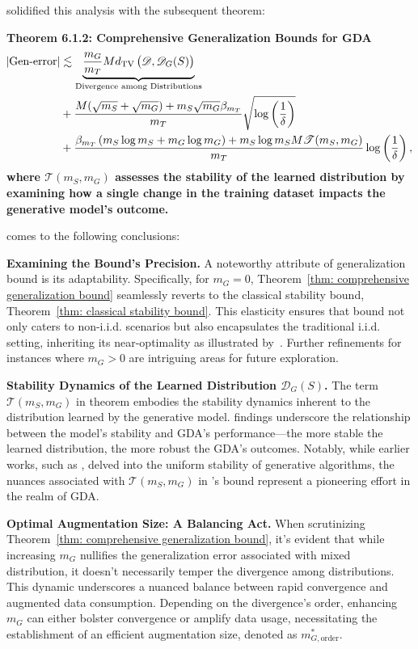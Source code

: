 \documentclass[preprint,12pt,authoryear]{elsarticle}
\newcommand{\sD}{{\mathscr D}}
\newcommand{\sT}{{\mathscr T}}
\newcommand{\DG}{\sD_G(S)}
\begin{document}
\cite{171_theory} solidified this analysis with the subsequent theorem:

\textbf{Theorem 6.1.2: Comprehensive Generalization Bounds for GDA}
\label{thm: comprehensive generalization bound}
\begin{align*}
\abs{\text{Gen-error}} 
&\lesssim \underbrace{\frac{m_G}{m_T}M d_{\mathrm{TV}} \left(\sD , \DG \right)}_{\text{Divergence among Distributions}} \\
&+ \frac{M(\sqrt{m_S} + \sqrt{m_G}) + m_S\sqrt{m_G}\beta_{m_T} }{m_T} \sqrt{\log \left(\frac{1}{\delta}\right)}\\
&+\frac{\beta_{m_T} \left(m_S \log m_S + m_G \log m_G\right) + m_S \log m_S M \sT(m_S, m_G) }{m_T} \log \left(\frac{1}{\delta}\right),
\end{align*}
\textbf{where $\sT(m_S, m_G)$ assesses the stability of the learned distribution by examining how a single change in the training dataset impacts the generative model's outcome.}

\cite{171_theory} comes to the following conclusions:

\textbf{Examining the Bound's Precision.} A noteworthy attribute of \cite{171_theory} generalization bound is its adaptability. Specifically, for $m_G = 0$, Theorem~\ref{thm: comprehensive generalization bound} seamlessly reverts to the classical stability bound, Theorem~\ref{thm: classical stability bound}. This elasticity ensures that \cite{171_theory} bound not only caters to non-i.i.d. scenarios but also encapsulates the traditional i.i.d. setting, inheriting its near-optimality as illustrated by~\cite{166_theory}. Further refinements for instances where $m_G > 0$ are intriguing areas for future exploration.

\textbf{Stability Dynamics of the Learned Distribution $\DG$.} The term $\sT(m_S, m_G)$ in \cite{171_theory} theorem embodies the stability dynamics inherent to the distribution learned by the generative model. \cite{171_theory} findings underscore the relationship between the model's stability and GDA's performance—the more stable the learned distribution, the more robust the GDA's outcomes. Notably, while earlier works, such as \cite{170_theory}, delved into the uniform stability of generative algorithms, the nuances associated with $\sT(m_S, m_G)$ in \cite{171_theory}'s bound represent a pioneering effort in the realm of GDA.

\textbf{Optimal Augmentation Size: A Balancing Act.} When scrutinizing Theorem~\ref{thm: comprehensive generalization bound}, it's evident that while increasing $m_G$ nullifies the generalization error associated with mixed distribution, it doesn't necessarily temper the divergence among distributions. This dynamic underscores a nuanced balance between rapid convergence and augmented data consumption. Depending on the divergence's order, enhancing $m_G$ can either bolster convergence or amplify data usage, necessitating the establishment of an efficient augmentation size, denoted as $m_{G, \mathrm{order}}^*$. 
\end{document}
